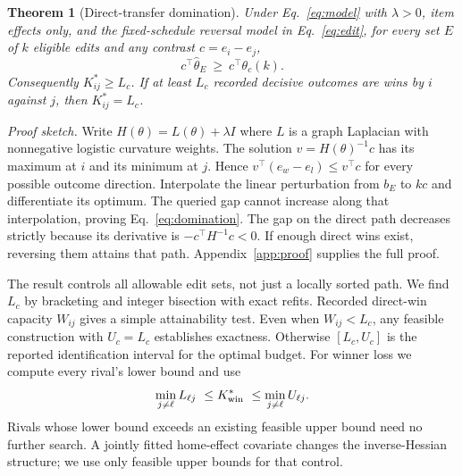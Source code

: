 \documentclass{article}
\newtheorem{theorem}{Theorem}
\begin{document}
\begin{theorem}[Direct-transfer domination]
\label{thm:direct}
Under Eq.~\eqref{eq:model} with $\lambda>0$, item effects only, and the fixed-schedule reversal model in Eq.~\eqref{eq:edit}, for every set $E$ of $k$ eligible edits and any contrast $c=e_i-e_j$,
\begin{equation}
 c^\top\hat\theta_E\ \ge\ c^\top\theta_c(k). \label{eq:domination}
\end{equation}
Consequently $K^*_{ij}\ge L_c$. If at least $L_c$ recorded decisive outcomes are wins by $i$ against $j$, then $K^*_{ij}=L_c$.
\end{theorem}
\noindent\emph{Proof sketch.} Write $H(\theta)=L(\theta)+\lambda I$ where $L$ is a graph Laplacian with nonnegative logistic curvature weights. The solution $v=H(\theta)^{-1}c$ has its maximum at $i$ and its minimum at $j$. Hence $v^\top(e_w-e_l)\le v^\top c$ for every possible outcome direction. Interpolate the linear perturbation from $b_E$ to $kc$ and differentiate its optimum. The queried gap cannot increase along that interpolation, proving Eq.~\eqref{eq:domination}. The gap on the direct path decreases strictly because its derivative is $-c^\top H^{-1}c<0$. If enough direct wins exist, reversing them attains that path. Appendix~\ref{app:proof} supplies the full proof.

The result controls all allowable edit sets, not just a locally sorted path. We find $L_c$ by bracketing and integer bisection with exact refits. Recorded direct-win capacity $W_{ij}$ gives a simple attainability test. Even when $W_{ij}<L_c$, any feasible construction with $U_c=L_c$ establishes exactness. Otherwise $[L_c,U_c]$ is the reported identification interval for the optimal budget. For winner loss we compute every rival's lower bound and use
\begin{equation}
 \min_{j\ne\ell}L_{\ell j}\ \le K^*_{\rm win}\ \le
 \min_{j\ne\ell}U_{\ell j}. \label{eq:winner}
\end{equation}
Rivals whose lower bound exceeds an existing feasible upper bound need no further search. A jointly fitted home-effect covariate changes the inverse-Hessian structure; we use only feasible upper bounds for that control.
\end{document}
